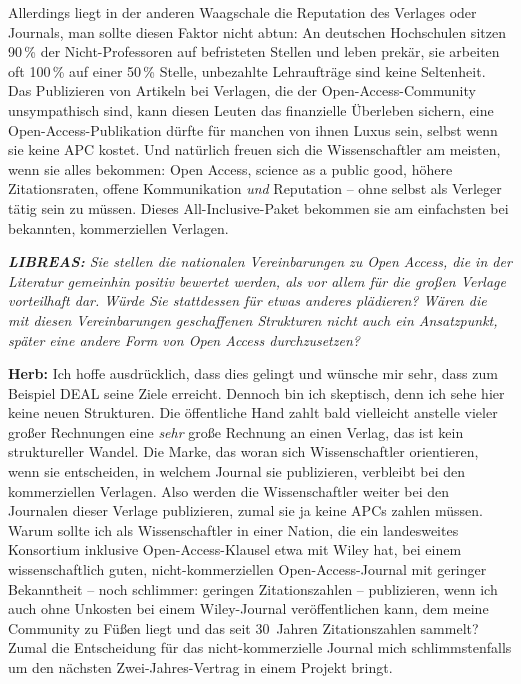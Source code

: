 \documentclass[a4paper,
fontsize=11pt,
oneside,
numbers=noperiodatend,
parskip=half-,
bibliography=totoc,
final
]{scrartcl}
\begin{document}
Allerdings liegt in der anderen Waagschale die Reputation des Verlages
oder Journals, man sollte diesen Faktor nicht abtun: An deutschen
Hochschulen sitzen 90\,\% der Nicht-Professoren auf befristeten Stellen
und leben prekär, sie arbeiten oft 100\,\% auf einer 50\,\% Stelle,
unbezahlte Lehraufträge sind keine Seltenheit. Das Publizieren von
Artikeln bei Verlagen, die der Open-Access-Community unsympathisch sind,
kann diesen Leuten das finanzielle Überleben sichern, eine
Open-Access-Publikation dürfte für manchen von ihnen Luxus sein, selbst
wenn sie keine APC kostet. Und natürlich freuen sich die Wissenschaftler
am meisten, wenn sie alles bekommen: Open Access, science as a public
good, höhere Zitationsraten, offene Kommunikation \emph{und} Reputation
-- ohne selbst als Verleger tätig sein zu müssen. Dieses
All-Inclusive-Paket bekommen sie am einfachsten bei bekannten,
kommerziellen Verlagen.

\emph{\textbf{LIBREAS:} Sie stellen die nationalen Vereinbarungen zu
Open Access, die in der Literatur gemeinhin positiv bewertet werden, als
vor allem für die großen Verlage vorteilhaft dar. Würde Sie stattdessen
für etwas anderes plädieren? Wären die mit diesen Vereinbarungen
geschaffenen Strukturen nicht auch ein Ansatzpunkt, später eine andere
Form von Open Access durchzusetzen?}

\textbf{Herb:} Ich hoffe ausdrücklich, dass dies gelingt und wünsche mir
sehr, dass zum Beispiel DEAL seine Ziele erreicht. Dennoch bin ich
skeptisch, denn ich sehe hier keine neuen Strukturen. Die öffentliche
Hand zahlt bald vielleicht anstelle vieler großer Rechnungen eine
\emph{sehr} große Rechnung an einen Verlag, das ist kein struktureller
Wandel. Die Marke, das woran sich Wissenschaftler orientieren, wenn sie
entscheiden, in welchem Journal sie publizieren, verbleibt bei den
kommerziellen Verlagen. Also werden die Wissenschaftler weiter bei den
Journalen dieser Verlage publizieren, zumal sie ja keine APCs zahlen
müssen. Warum sollte ich als Wissenschaftler in einer Nation, die ein
landesweites Konsortium inklusive Open-Access-Klausel etwa mit Wiley
hat, bei einem wissenschaftlich guten, nicht-kommerziellen
Open-Access-Journal mit geringer Bekanntheit -- noch schlimmer: geringen
Zitationszahlen -- publizieren, wenn ich auch ohne Unkosten bei einem
Wiley-Journal veröffentlichen kann, dem meine Community zu Füßen liegt
und das seit 30~Jahren Zitationszahlen sammelt? Zumal die Entscheidung
für das nicht-kommerzielle Journal mich schlimmstenfalls um den nächsten
Zwei-Jahres-Vertrag in einem Projekt bringt.
\end{document}
